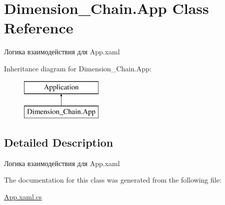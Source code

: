 \hypertarget{class_dimension___chain_1_1_app}{}\section{Dimension\+\_\+\+Chain.\+App Class Reference}
\label{class_dimension___chain_1_1_app}


Логика взаимодействия для App.\+xaml  


Inheritance diagram for Dimension\+\_\+\+Chain.\+App\+:\begin{figure}[H]
\begin{center}
\leavevmode
\includegraphics[height=2.000000cm]{class_dimension___chain_1_1_app}
\end{center}
\end{figure}


\subsection{Detailed Description}
Логика взаимодействия для App.\+xaml 



The documentation for this class was generated from the following file\+:\begin{DoxyCompactItemize}
\item 
\mbox{\hyperlink{_app_8xaml_8cs}{App.\+xaml.\+cs}}\end{DoxyCompactItemize}
